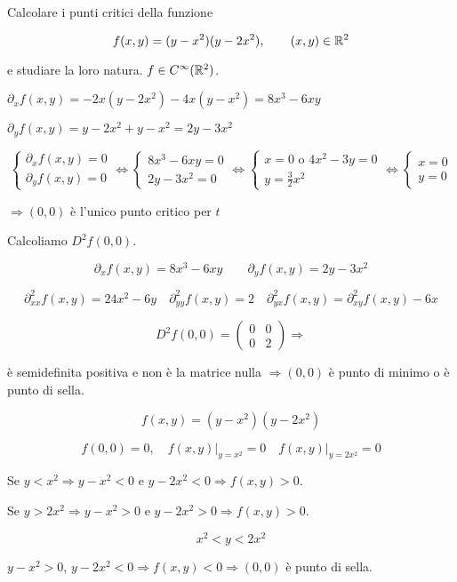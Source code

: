 \begin{exbar}
\begin{example}
	Calcolare i punti critici della funzione 
	
	$$f(x,y)=(y-x^2)(y-2x^2), \qquad (x,y) \in \mathbb{R}^2$$
	
	e studiare la loro natura. $f\in C^\infty (\mathbb{R}^2)$.
	
	$\partial_xf(x,y)=-2x(y-2x^2)-4x(y-x^2)=8x^3-6xy$
	
	$\partial_yf(x,y)=y-2x^2+y-x^2=2y-3x^2$
	
	$$\begin{cases}
		\partial_xf(x,y)=0\\
		\partial_yf(x,y)=0
	\end{cases} \Leftrightarrow 
	\begin{cases}
		8x^3-6xy=0\\
		2y-3x^2=0
	\end{cases} \Leftrightarrow 
	\begin{cases}
		x=0 \text{   o   } 4x^2-3y=0\\
		y=\frac{3}{2}x^2
	\end{cases}\Leftrightarrow 
	\begin{cases}
		x=0\\
		y=0
	\end{cases}$$
	
	$\Rightarrow(0,0)$ è l'unico punto critico per $t$
	
	Calcoliamo $D^2f(0,0)$.
	
	$$\partial_x f(x,y) = 8x^3-6xy \qquad \partial_y f(x,y) = 2y-3x^2$$
	
	$$\partial_{xx}^2f(x,y)=24x^2-6y \quad \partial_{yy}^2f(x,y)=2 \quad \partial_{yx}^2f(x,y)=\partial_{xy}^2f(x,y)-6x$$
	
	$$D^2f(0,0)=\begin{pmatrix}
		0&0\\
		0&2
	\end{pmatrix} \Rightarrow$$
	
	è semidefinita positiva e non è la matrice nulla $\Rightarrow (0,0)$ è punto di minimo o è punto di sella.
	
	$$f(x,y)=(y-x^2)(y-2x^2)$$
	
	$$f(0,0)=0, \quad f(x,y) \big|_{y=x^2}=0 \quad f(x,y)\big|_{y=2x^2}=0$$
	

	Se $y < x^2 \Rightarrow y-x^2 < 0$ e $y-2x^2< 0 \Rightarrow f(x,y)>0$. 
	
	Se $y > 2x^2 \Rightarrow y-x^2 >0$ e $y-2x^2 >0 \Rightarrow f(x,y)> 0$.
	
	$$x^2< y< 2x^2$$
	
	$y- x^2>0$, $y-2x^2< 0 \Rightarrow f(x,y)<0 \Rightarrow (0,0)$ è punto di sella.
\end{example}
\end{exbar}


